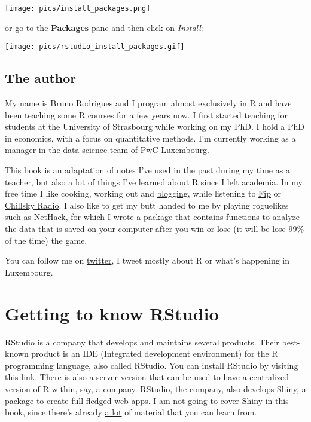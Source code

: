 \documentclass[
]{article}
\begin{document}
\texttt{[image: pics/install\_packages.png]}

or go to the \textbf{Packages} pane and then click on \emph{Install}:

\texttt{[image: pics/rstudio\_install\_packages.gif]}

\hypertarget{the-author}{%
\subsection*{The author}\label{the-author}}

My name is Bruno Rodrigues and I program almost exclusively in R and have been teaching some R
courses for a few years now. I first started teaching for students at the University of Strasbourg
while working on my PhD. I hold a PhD in economics, with a focus on quantitative methods.
I'm currently working as a manager in the data science team of PwC Luxembourg.

This book is an adaptation of notes I've used in the past during my time as a teacher, but also
a lot of things I've learned about R since I left academia.
In my free time I like cooking, working out and \href{https://www.brodrigues.co}{blogging}, while listening to
\href{http://www.fipradio.fr/player}{Fip} or
\href{https://tunein.com/radio/Lofi-HipHop-Radio--Chillsky-s288329/}{Chillsky Radio}.
I also like to get my butt handed to me by playing roguelikes
such as \href{http://nethack.wikia.com/wiki/NetHack}{NetHack}, for which I wrote a
\href{https://github.com/b-rodrigues/nethack}{package} that contains functions to analyze the data that
is saved on your computer after you win or lose (it will be lose 99\% of the time) the game.

You can follow me on \href{https://www.twitter.com/brodriguesco}{twitter}, I tweet mostly about R or
what's happening in Luxembourg.

\hypertarget{getting-to-know-rstudio}{%
\section{Getting to know RStudio}\label{getting-to-know-rstudio}}

RStudio is a company that develops and maintains several products. Their best-known product is
an IDE (Integrated development environment) for the R programming language, also called RStudio.
You can install RStudio by visiting this \href{https://www.rstudio.com/products/rstudio/download/}{link}.
There is also a server version that can be used to have a centralized version of R within, say, a
company. RStudio, the company, also develops \href{https://shiny.rstudio.com/}{Shiny}, a package to
create full-fledged web-apps. I am not going to cover Shiny in this book, since there's already
\href{http://shiny.rstudio.com/tutorial/}{a lot} of material that you can learn from.
\end{document}
